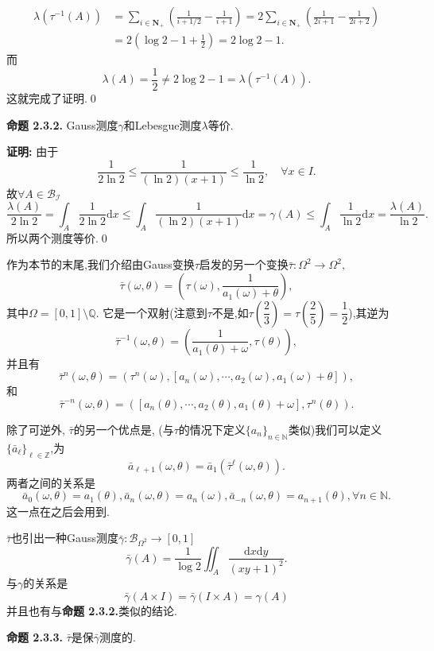 $$
\begin{aligned}
\lambda\left(\tau^{-1}\left(A\right)\right)& =\sum_{i\in\mathbf{N}_{+}}\left(\frac{1}{i+1/2}-\frac{1}{i+1}\right)=2\sum_{i\in\mathbf{N}_{+}}\left(\frac{1}{2i+1}-\frac{1}{2i+2}\right)  \\
&=2\left(\log2-1+\frac12\right)=2\log2-1.
\end{aligned}
$$
而
$$\lambda(A)=\frac{1}{2}\neq2\log2-1=\lambda\left(\tau^{-1}\left(A\right)\right).$$
这就完成了证明.\qed
\par
\textbf{命题 2.3.2.  }\textsuperscript{\cite{Liu_Peng}}
Gauss测度$\gamma$和Lebesgue测度$\lambda$等价.
\par
\textbf{证明:  }
由于
$$\frac{1}{2\ln2}\leqslant \frac{1}{(\ln2)(x+1)}\leqslant \frac{1}{\ln2},\quad \forall x\in I.$$
故$\forall A\in \mathcal{B_I}$
$$\frac{\lambda(A)}{2\ln2}=\int_A \frac{1}{2\ln2}\mathrm{d}x\leqslant \int_A\frac{1}{(\ln2)(x+1)}\mathrm{d}x=\gamma(A)\leqslant \int_A\frac{1}{\ln2}\mathrm{d}x=\frac{\lambda(A)}{\ln2}.$$
所以两个测度等价.\qed
\par
作为本节的末尾,我们介绍由Gauss变换$\tau$启发的另一个变换$\bar{\tau}:\Omega^2\to\Omega^2,$
$$\bar{\tau}\left(\omega,\theta\right)=\left(\tau\left(\omega\right),\frac{1}{a_1\left(\omega\right)+\theta}\right),$$
其中$\Omega=[0,1]\setminus\mathbb{Q}$.
它是一个双射(注意到$\tau$不是,如$\tau(\dfrac{2}{3})=\tau(\dfrac{2}{5})=\dfrac{1}{2}$),其逆为
$$\bar{\tau}^{-1}\left(\omega,\theta\right)=\left(\frac{1}{a_1\left(\theta\right)+\omega},\tau\left(\theta\right)\right),$$
并且有
$$\bar{\tau}^{n}\left(\omega,\theta\right)=\left(\tau^{n}\left(\omega\right),\left[a_{n}\left(\omega\right),\cdots,a_{2}\left(\omega\right),a_{1}\left(\omega\right)+\theta\right]\right),$$
和
$$\bar{\tau}^{-n}\left(\omega,\theta\right)=\left([a_{n}\left(\theta\right),\cdots,a_{2}\left(\theta\right),a_{1}\left(\theta\right)+\omega],\tau^{n}\left(\theta\right)\right).$$\par
除了可逆外, $\bar\tau$的另一个优点是, (与$\tau$的情况下定义$\{a_{n}\}_{n\in\mathbb{N}}$类似)我们可以定义$\{\bar{a}_{\ell}\}_{\ell\in\mathbb{Z}}$,为
$$\bar{a}_{\ell+1}\left(\omega,\theta\right)=\bar{a}_1\left(\bar{\tau}^\ell\left(\omega,\theta\right)\right).$$
两者之间的关系是
\begin{equation}\label{taubartauan}
\bar{a}_{0}\left(\omega,\theta\right)=a_{1}\left(\theta\right),\bar{a}_{n}\left(\omega,\theta\right)=a_{n}\left(\omega\right),\bar{a}_{-n}\left(\omega,\theta\right)=a_{n+1}\left(\theta\right),\forall n\in\mathbb{N}.
\end{equation}
这一点在之后会用到.\par
$\bar\tau$也引出一种Gauss测度$\bar\gamma:\mathcal{B}_{\Omega^2}\to[0,1]$
$$\bar{\gamma}(A)=\frac{1}{\log2}\iint_A\frac{\mathrm{d}x\mathrm{d}y}{\left(xy+1\right)^2}.$$
与$\gamma$的关系是
$$\bar{\gamma}(A\times I) = \bar{\gamma}(I\times A) = \gamma(A)$$
并且也有与\textbf{命题 2.3.2.}类似的结论.\par
\textbf{命题 2.3.3.  }\textsuperscript{\cite{Iosifescu}}
$\bar\tau$是保$\bar\gamma$测度的.
\par
